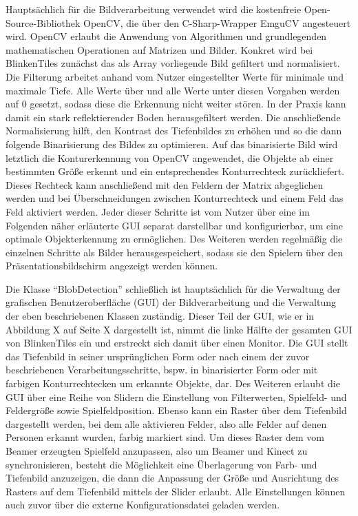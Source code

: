 Hauptsächlich für die Bildverarbeitung verwendet wird die kostenfreie Open-Source-Bibliothek OpenCV, die über den C-Sharp-Wrapper EmguCV angesteuert wird. OpenCV erlaubt die Anwendung von Algorithmen und grundlegenden mathematischen Operationen auf Matrizen und Bilder. Konkret wird bei BlinkenTiles zunächst das als Array vorliegende Bild gefiltert und normalisiert. Die Filterung arbeitet anhand vom Nutzer eingestellter Werte für minimale und maximale Tiefe. Alle Werte über und alle Werte unter diesen Vorgaben werden auf 0 gesetzt, sodass diese die Erkennung nicht weiter stören. In der Praxis kann damit ein stark reflektierender Boden herausgefiltert werden. Die anschließende Normalisierung hilft, den Kontrast des Tiefenbildes zu erhöhen und so die dann folgende Binarisierung des Bildes zu optimieren. Auf das binarisierte Bild wird letztlich die Konturerkennung von OpenCV angewendet, die Objekte ab einer bestimmten Größe erkennt und ein entsprechendes Konturrechteck zurückliefert. Dieses Rechteck kann anschließend mit den Feldern der Matrix abgeglichen werden und bei Überschneidungen zwischen Konturrechteck und einem Feld das Feld aktiviert werden. Jeder dieser Schritte ist vom Nutzer über eine im Folgenden näher erläuterte GUI separat darstellbar und konfigurierbar, um eine optimale Objekterkennung zu ermöglichen. Des Weiteren werden regelmäßig die einzelnen Schritte als Bilder herausgespeichert, sodass sie den Spielern über den Präsentationsbildschirm angezeigt werden können.

Die Klasse \enquote{BlobDetection} schließlich ist hauptsächlich für die Verwaltung der grafischen Benutzeroberfläche (GUI) der Bildverarbeitung und die Verwaltung der eben beschriebenen Klassen zuständig. Dieser Teil der GUI, wie er in Abbildung X auf Seite X dargestellt ist, nimmt die linke Hälfte der gesamten GUI von BlinkenTiles ein und erstreckt sich damit über einen Monitor. Die GUI stellt das Tiefenbild in seiner ursprünglichen Form oder nach einem der zuvor beschriebenen Verarbeitungsschritte, bspw. in binarisierter Form oder mit farbigen Konturrechtecken um erkannte Objekte, dar. Des Weiteren erlaubt die GUI über eine Reihe von Slidern die Einstellung von Filterwerten, Spielfeld- und Feldergröße sowie Spielfeldposition. Ebenso kann ein Raster über dem Tiefenbild dargestellt werden, bei dem alle aktivieren Felder, also alle Felder auf denen Personen erkannt wurden, farbig markiert sind. Um dieses Raster dem vom Beamer erzeugten Spielfeld anzupassen, also um Beamer und Kinect zu synchronisieren, besteht die Möglichkeit eine Überlagerung von Farb- und Tiefenbild anzuzeigen, die dann die Anpassung der Größe und Ausrichtung des Rasters auf dem Tiefenbild mittels der Slider erlaubt. Alle Einstellungen können auch zuvor über die externe Konfigurationsdatei geladen werden.

